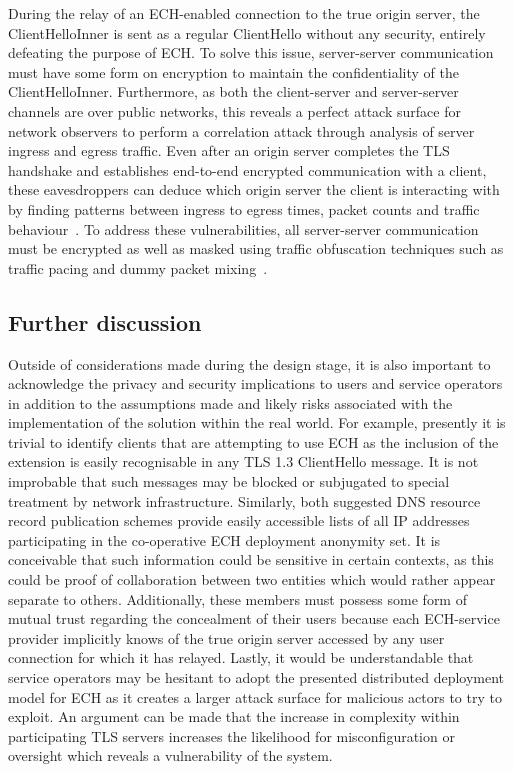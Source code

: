 \documentclass[a4paper,oneside,12pt]{article}
\begin{document}
During the relay of an ECH-enabled connection to the true origin server, the ClientHelloInner is sent as a regular ClientHello without any security, entirely defeating the purpose of ECH. To solve this issue, server-server communication must have some form on encryption to maintain the confidentiality of the ClientHelloInner. Furthermore, as both the client-server and server-server channels are over public networks, this reveals a perfect attack surface for network observers to perform a correlation attack through analysis of server ingress and egress traffic. Even after an origin server completes the TLS handshake and establishes end-to-end encrypted communication with a client, these eavesdroppers can deduce which origin server the client is interacting with by finding patterns between ingress to egress times, packet counts and traffic behaviour~\cite{back2001traffic}. To address these vulnerabilities, all server-server communication must be encrypted as well as masked using traffic obfuscation techniques such as traffic pacing and dummy packet mixing~\cite{fu2003analytical}.


\subsection*{Further discussion}

Outside of considerations made during the design stage, it is also important to acknowledge the privacy and security implications to users and service operators in addition to the assumptions made and likely risks associated with the implementation of the solution within the real world. For example, presently it is trivial to identify clients that are attempting to use ECH as the inclusion of the extension is easily recognisable in any TLS 1.3 ClientHello message. It is not improbable that such messages may be blocked or subjugated to special treatment by network infrastructure. Similarly, both suggested DNS resource record publication schemes provide easily accessible lists of all IP addresses participating in the co-operative ECH deployment anonymity set. It is conceivable that such information could be sensitive in certain contexts, as this could be proof of collaboration between two entities which would rather appear separate to others. Additionally, these members must possess some form of mutual trust regarding the concealment of their users because each ECH-service provider implicitly knows of the true origin server accessed by any user connection for which it has relayed. Lastly, it would be understandable that service operators may be hesitant to adopt the presented distributed deployment model for ECH as it creates a larger attack surface for malicious actors to try to exploit. An argument can be made that the increase in complexity within participating TLS servers increases the likelihood for misconfiguration or oversight which reveals a vulnerability of the system.
\end{document}
